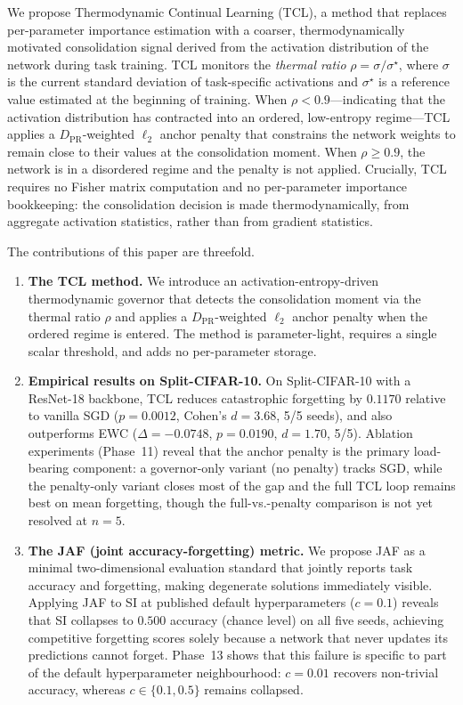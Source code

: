 We propose Thermodynamic Continual Learning (TCL), a method that replaces
per-parameter importance estimation with a coarser, thermodynamically motivated
consolidation signal derived from the activation distribution of the network
during task training.
TCL monitors the \emph{thermal ratio} $\rho = \sigma / \sigma^\star$, where
$\sigma$ is the current standard deviation of task-specific activations and
$\sigma^\star$ is a reference value estimated at the beginning of training.
When $\rho < 0.9$---indicating that the activation distribution has contracted
into an ordered, low-entropy regime---TCL applies a $D_\text{PR}$-weighted
$\ell_2$ anchor penalty that constrains the network weights to remain close to
their values at the consolidation moment.
When $\rho \geq 0.9$, the network is in a disordered regime and the penalty is
not applied.
Crucially, TCL requires no Fisher matrix computation and no per-parameter
importance bookkeeping: the consolidation decision is made thermodynamically,
from aggregate activation statistics, rather than from gradient statistics.

The contributions of this paper are threefold.
\begin{enumerate}
  \item \textbf{The TCL method.}
        We introduce an activation-entropy-driven thermodynamic governor
        that detects the consolidation moment via the thermal ratio $\rho$
        and applies a $D_\text{PR}$-weighted $\ell_2$ anchor penalty when the
        ordered regime is entered.
        The method is parameter-light, requires a single scalar threshold,
        and adds no per-parameter storage.

  \item \textbf{Empirical results on Split-CIFAR-10.}
        On Split-CIFAR-10 with a ResNet-18 backbone, TCL reduces catastrophic
        forgetting by $0.1170$ relative to vanilla SGD ($p = 0.0012$,
        Cohen's $d = 3.68$, 5/5 seeds), and also outperforms EWC
        ($\Delta = -0.0748$, $p = 0.0190$, $d = 1.70$, 5/5).
        Ablation experiments (Phase~11) reveal that the anchor penalty is
        the primary load-bearing component: a governor-only variant (no penalty)
        tracks SGD, while the penalty-only variant closes most of the gap and
        the full TCL loop remains best on mean forgetting, though the
        full-vs.-penalty comparison is not yet resolved at $n=5$.

  \item \textbf{The JAF (joint accuracy-forgetting) metric.}
        We propose JAF as a minimal two-dimensional evaluation standard that
        jointly reports task accuracy and forgetting, making degenerate
        solutions immediately visible.
        Applying JAF to SI at published default hyperparameters ($c = 0.1$)
        reveals that SI collapses to $0.500$ accuracy (chance level) on all
        five seeds, achieving competitive forgetting scores solely because a
        network that never updates its predictions cannot forget.
        Phase~13 shows that this failure is specific to part of the default
        hyperparameter neighbourhood: $c=0.01$ recovers non-trivial accuracy,
        whereas $c \in \{0.1, 0.5\}$ remains collapsed.
\end{enumerate}

